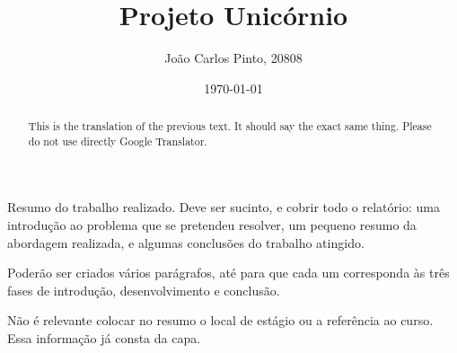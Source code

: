 \documentclass[a4paper,12pt,twoside]{book}
\title{Projeto Unicórnio}
\author{João Carlos Pinto, 20808}
\date{\today}
\begin{document}



\frontmatter
\maketitle  %

\begin{resumo}
Resumo do trabalho realizado. Deve ser sucinto, e cobrir todo o relatório: uma introdução ao problema que se pretendeu resolver, um pequeno resumo da abordagem realizada, e algumas conclusões do trabalho atingido.

Poderão ser criados vários parágrafos, até para que cada um corresponda às três fases de introdução, desenvolvimento e conclusão.

Não é relevante colocar no resumo o local de estágio ou a referência ao curso. Essa informação já consta da capa.
\end{resumo}

\begin{abstract}
This is the translation of the previous text. It should say the exact same thing. Please do not use directly Google Translator.
\end{abstract}

\begin{agradecimentos}
\end{agradecimentos}

\tableofcontents

\listoffigures
{}

\listoftables
{}

\lstlistoflistings
{}

\printglossary[type=\acronymtype,title={Siglas \& Acrónimos},toctitle={Siglas \& Acrónimos}]

\printglossary[title={Indice de Termos},toctitle={Indice de Termos}]

\mainmatter







\end{document}
